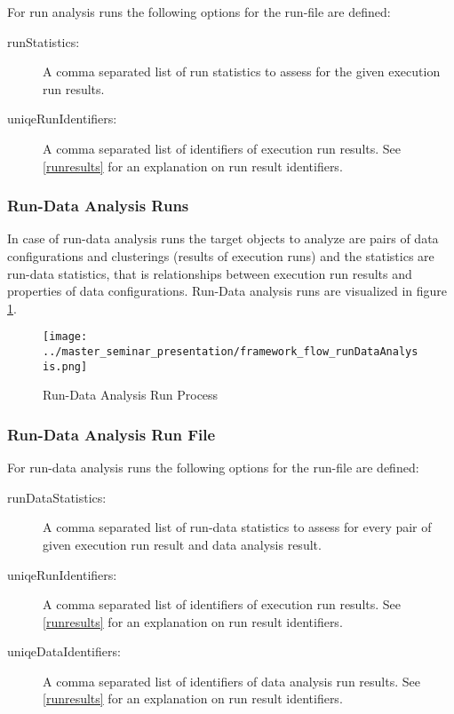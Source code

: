 		For run analysis runs the following options for the run-file are defined:
		 \begin{description}
		 	\item[runStatistics:] A comma separated list of run statistics to assess for the given execution run results.
		 	\item[uniqeRunIdentifiers:] A comma separated list of identifiers of execution run results. See \ref{runresults} for an explanation on run result identifiers.
		 \end{description}
		
		\subsubsection{Run-Data Analysis Runs} \label{runDataAnalysis_runs}		
			In case of run-data analysis runs the target objects to analyze are pairs of data configurations and clusterings (results of execution runs) and the statistics are run-data statistics, that is relationships between execution run results and properties of data configurations. Run-Data analysis runs are visualized in figure \ref{runDataAnalysis_run_process}.
		
		\begin{figure}[hbtp]
		\caption{Run-Data Analysis Run Process}
		\label{runDataAnalysis_run_process}
		\centering
		\texttt{[image: ../master\_seminar\_presentation/framework\_flow\_runDataAnalysis.png]}
		\end{figure}
		
		\subsubsection{Run-Data Analysis Run File}\label{runDataAnalysis_run_file}

		For run-data analysis runs the following options for the run-file are defined:
		 \begin{description}
		 	\item[runDataStatistics:] A comma separated list of run-data statistics to assess for every pair of given execution run result and data analysis result.
		 	\item[uniqeRunIdentifiers:] A comma separated list of identifiers of execution run results. See \ref{runresults} for an explanation on run result identifiers.
		 	\item[uniqeDataIdentifiers:] A comma separated list of identifiers of data analysis run results. See \ref{runresults} for an explanation on run result identifiers.
		 \end{description}
			
